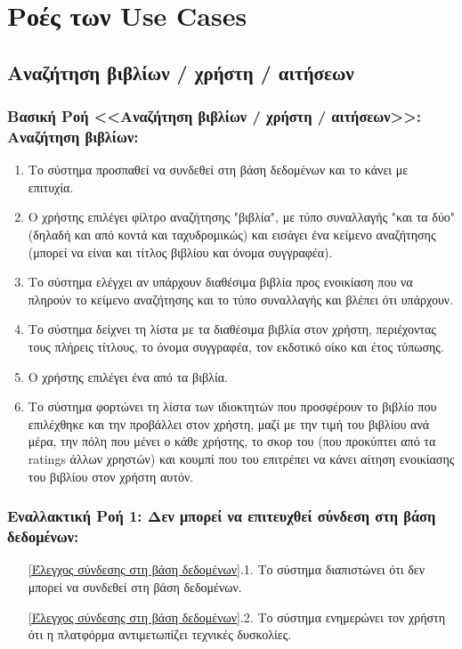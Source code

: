 \documentclass[12pt,a4paper]{article}
\begin{document}
\section{Ροές των Use Cases}
\label{Ροές των Use Cases}

\subsection{Αναζήτηση βιβλίων / χρήστη / αιτήσεων}

\subsubsection*{Βασική Ροή <<Αναζήτηση βιβλίων / χρήστη / αιτήσεων>>: Αναζήτηση βιβλίων:}
\begin{enumerate}
    \item Το σύστημα προσπαθεί να συνδεθεί στη βάση δεδομένων και το κάνει με επιτυχία.
        \label{Έλεγχος σύνδεσης στη βάση δεδομένων}
    \item Ο χρήστης επιλέγει φίλτρο αναζήτησης "βιβλία", με τύπο συναλλαγής "και τα δύο" (δηλαδή και από κοντά και ταχυδρομικώς) και εισάγει ένα κείμενο αναζήτησης (μπορεί να είναι και τίτλος βιβλίου και όνομα συγγραφέα).
        \label{Επιλογή τύπου αναζήτησης}
    \item Το σύστημα ελέγχει αν υπάρχουν διαθέσιμα βιβλία προς ενοικίαση που να πληρούν το κείμενο αναζήτησης και το τύπο συναλλαγής και βλέπει ότι υπάρχουν.
        \label{Ύπαρξη βιβλίου}
    \item Το σύστημα δείχνει τη λίστα με τα διαθέσιμα βιβλία στον χρήστη, περιέχοντας τους πλήρεις τίτλους, το όνομα συγγραφέα, τον εκδοτικό οίκο και έτος τύπωσης.
    \item Ο χρήστης επιλέγει ένα από τα βιβλία.
    \item Το σύστημα φορτώνει τη λίστα των ιδιοκτητών που προσφέρουν το βιβλίο που επιλέχθηκε και την προβάλλει στον χρήστη, μαζί με την τιμή του βιβλίου ανά μέρα, την πόλη που μένει ο κάθε χρήστης, το σκορ του (που προκύπτει από τα ratings άλλων χρηστών) και κουμπί που του επιτρέπει να κάνει αίτηση ενοικίασης του βιβλίου στον χρήστη αυτόν.
\end{enumerate}

\subsubsection*{Εναλλακτική Ροή 1: Δεν μπορεί να επιτευχθεί σύνδεση στη βάση δεδομένων:}
\begin{enumerate}
    \item[\ref{Έλεγχος σύνδεσης στη βάση δεδομένων}.1.] Το σύστημα διαπιστώνει ότι δεν μπορεί να συνδεθεί στη βάση δεδομένων.
    \item[\ref{Έλεγχος σύνδεσης στη βάση δεδομένων}.2.] Το σύστημα ενημερώνει τον χρήστη ότι η πλατφόρμα αντιμετωπίζει τεχνικές δυσκολίες.
\end{enumerate}
\end{document}
